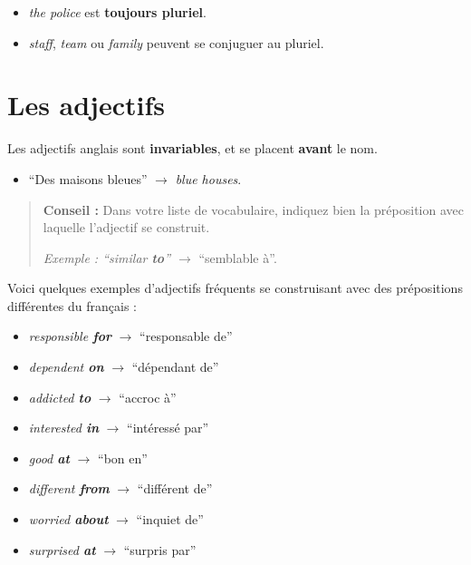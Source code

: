 \documentclass[
  10pt,
]{article}
\providecommand{\tightlist}{%
  \setlength{\itemsep}{0pt}\setlength{\parskip}{0pt}}
\begin{document}
\begin{itemize}
\tightlist
\item
  \color[HTML]{red}\emph{the police} \color{black} est \textbf{toujours pluriel}.
\item
  \emph{staff}, \emph{team} ou \emph{family} peuvent se conjuguer au pluriel.
\end{itemize}

\hypertarget{les-adjectifs}{%
\section{Les adjectifs}\label{les-adjectifs}}

Les adjectifs anglais sont \textbf{invariables}, et se placent \textbf{avant} le nom.

\begin{itemize}
\tightlist
\item
  ``Des maisons bleues'' \(\rightarrow\) \emph{blue houses}.
\end{itemize}

\begin{quote}
\textbf{Conseil :} Dans votre liste de vocabulaire, indiquez bien la préposition avec laquelle l'adjectif se construit.

\emph{Exemple : ``similar \textbf{to}'' \(\rightarrow\)} ``semblable à''.
\end{quote}

Voici quelques exemples d'adjectifs fréquents se construisant avec des prépositions différentes du français :

\begin{itemize}
\tightlist
\item
  \emph{responsible \textbf{for}} \(\rightarrow\) ``responsable de''
\item
  \emph{dependent \textbf{on}} \(\rightarrow\) ``dépendant de''
\item
  \emph{addicted \textbf{to}} \(\rightarrow\) ``accroc à''
\item
  \emph{interested \textbf{in}} \(\rightarrow\) ``intéressé par''
\item
  \emph{good \textbf{at}} \(\rightarrow\) ``bon en''
\item
  \emph{different \textbf{from}} \(\rightarrow\) ``différent de''
\item
  \emph{worried \textbf{about}} \(\rightarrow\) ``inquiet de''
\item
  \emph{surprised \textbf{at}} \(\rightarrow\) ``surpris par''
\end{itemize}
\end{document}

